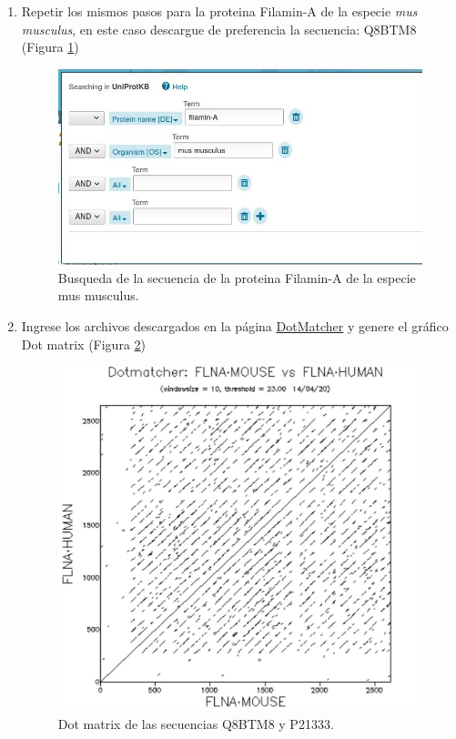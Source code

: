 \documentclass{article}
\begin{document}
\begin{enumerate}
    \item Repetir los mismos pasos para la proteina Filamin-A de la especie \textit{mus musculus}, en este caso descargue de preferencia la secuencia: Q8BTM8 (Figura \ref{img:uniprot5})
    
    \begin{figure}[h]
     \centering
        \includegraphics[width=\textwidth,height=0.3\textheight,keepaspectratio]{img/alignment/uniprot5.jpg}
        \caption{Busqueda de la secuencia de la proteina Filamin-A de la especie mus musculus.}
        \label{img:uniprot5}
    \end{figure}
    
    \item Ingrese los archivos descargados en la página \href{http://bioinfo.nhri.org.tw/cgi-bin/emboss/dotmatcher}{DotMatcher} y genere el gráfico Dot matrix (Figura \ref{img:dot2})
    
    \begin{figure}[h]
     \centering
        \includegraphics[width=\textwidth,height=0.4\textheight,keepaspectratio]{img/alignment/dot2.jpg}
        \caption{Dot matrix de las secuencias Q8BTM8 y P21333.}
        \label{img:dot2}
    \end{figure}
   
\end{enumerate}
\end{document}
